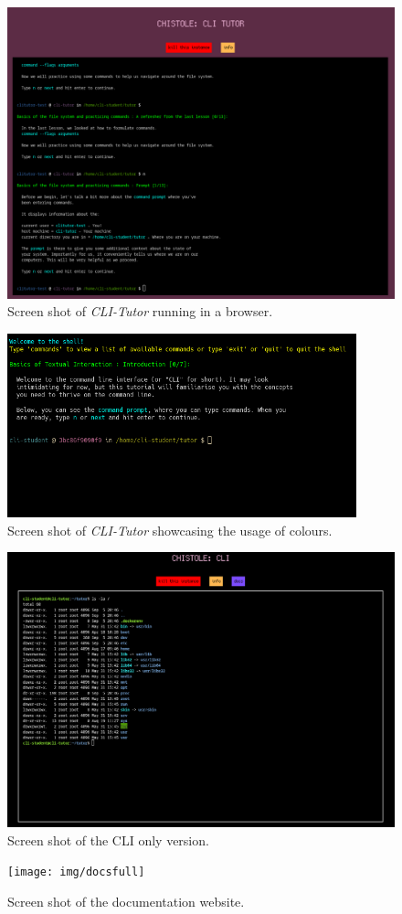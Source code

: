 \begin{figure}[htbp]
	\centering
	\includegraphics[width=1\textwidth]{img/cliwebshort}
	\caption{Screen shot of \textit{CLI-Tutor} running in a browser.}
	\label{fig:webversion}
\end{figure}

\begin{figure}[htbp]
	\centering
	\includegraphics[width=0.9\textwidth]{img/lesson1.1}
	\caption{Screen shot of \textit{CLI-Tutor} showcasing the usage of colours.}
	\label{fig:colours}
\end{figure}

\begin{figure}[htbp]
	\centering
	\includegraphics[height=0.5\textheight]{img/clionly}
	\caption{Screen shot of the CLI only version.}
	\label{fig:cliversion}
\end{figure}

\begin{figure}[htbp]
	\centering
	\texttt{[image: img/docsfull]}
	\caption{Screen shot of the documentation website.}
	\label{fig:docsweb}
\end{figure}

